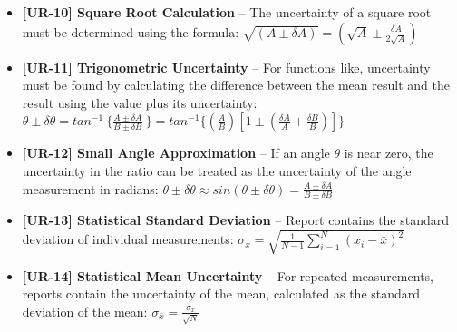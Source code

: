 \documentclass{article}
\begin{document}
\begin{itemize}
\item \textbf{ [UR-10] Square Root Calculation } – The uncertainty of a square root must be determined using the formula: $ \sqrt{(A \pm \delta A)} = \left( \sqrt{A} \pm \frac{\delta A}{2\sqrt{A}} \right) $
\item \textbf{ [UR-11] Trigonometric Uncertainty } – For functions like, uncertainty must be found by calculating the difference between the mean result and the result using the value plus its uncertainty: $ \theta \pm \delta \theta = tan^{-1}\ \{ \frac {A \pm \delta A}{B \pm \delta B}\ \} = tan^{-1} \{  \left( \frac{A}{B} \right) \left[ 1 \pm \left( \frac{\delta A}{A} + \frac{\delta B}{B} \right) \right]  \} $
\item \textbf{ [UR-12] Small Angle Approximation } – If an angle $\theta$ is near zero, the uncertainty in the ratio can be treated as the uncertainty of the angle measurement in radians: $ \theta \pm \delta \theta \approx sin( \theta \pm \delta \theta) = \frac { A \pm \delta A } { B \pm \delta B } $
\item \textbf{ [UR-13] Statistical Standard Deviation } – Report contains the standard deviation of individual measurements: $ \sigma_x = \sqrt{\frac{1}{N-1} \sum_{i=1}^{N} (x_i - \bar{x})^2} $ 
\item \textbf{ [UR-14] Statistical Mean Uncertainty } – For repeated measurements, reports contain the uncertainty of the mean, calculated as the standard deviation of the mean: $ \sigma_{ \bar{x} } = \frac{\sigma_x}{\sqrt{N}} $
\end{itemize}
\end{document}
